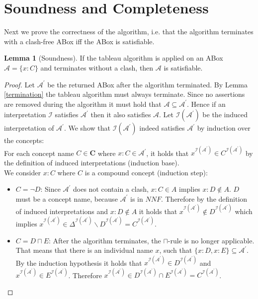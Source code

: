 \documentclass{book}
\theoremstyle{break}
\theoremstyle{definition}
\newtheorem{mylem}{Lemma}
\begin{document}
\section{Soundness and Completeness}
Next we prove the correctness of the algorithm, i.e. that the algorithm terminates with a clash-free ABox iff the ABox is satisfiable.
\begin{mylem}[Soundness]
If the tableau algorithm is applied on an ABox $\mathcal{A}=\{x:C\}$ and  terminates without a clash, then $\mathcal{A}$ is satisfiable.
\end{mylem}
\begin{proof}
Let $\mathcal{A}^\prime$ be the returned ABox after the algorithm terminated. By Lemma \ref{termination} the tableau algorithm must always terminate. Since no assertions are removed during the algorithm it must hold that $\mathcal{A}\subseteq\mathcal{A}^\prime$. Hence if an interpretation $\mathcal{I}$ satisfies $\mathcal{A}^\prime$ then it also satisfies $\mathcal{A}$. Let $\mathcal{I}(\mathcal{A}^\prime)$ be the induced interpretation of $\mathcal{A}^\prime$. We show that $\mathcal{I}(\mathcal{A}^\prime)$ indeed satisfies $\mathcal{A}^\prime$ by induction over the concepts:\\
For each concept name $C\in\mathbf{C}$ where $x:C\in\mathcal{A}^\prime$, it holds that $x^{\mathcal{I}(\mathcal{A}^\prime)}\in C^{\mathcal{I}(\mathcal{A}^\prime)}$ by the definition of induced interpretations (induction base).\\
We consider $x:C$ where $C$ is a compound concept (induction step):
\begin{itemize}
\item $C=\neg D$: Since $\mathcal{A}^\prime$ does not contain a clash, $x:C\in A$ implies $x:D\notin A$. $D$ must be a concept name, because $\mathcal{A}^\prime$ is in $NNF$. Therefore by the definition of induced interpretations and $x:D\notin A$ it holds that $x^{\mathcal{I}(\mathcal{A}^\prime)}\notin D^{\mathcal{I}(\mathcal{A}^\prime)}$ which implies $x^{\mathcal{I}(\mathcal{A}^\prime)}\in \Delta^{\mathcal{I}(\mathcal{A}^\prime)}\backslash D^{\mathcal{I}(\mathcal{A}^\prime)}=C^{\mathcal{I}(\mathcal{A}^\prime)}$.
\item $C=D\sqcap E$: After the algorithm terminates, the $\sqcap$-rule is no longer applicable. That means that there is an individual name $x$, such that $\{x:D, x:E\}\subseteq \mathcal{A}^\prime$. By the induction hypothesis it holds that $x^{\mathcal{I}(\mathcal{A}^\prime)}\in D^{\mathcal{I}(\mathcal{A}^\prime)}$ and $x^{\mathcal{I}(\mathcal{A}^\prime)}\in E^{\mathcal{I}(\mathcal{A}^\prime)}$. Therefore $x^{\mathcal{I}(\mathcal{A}^\prime)}\in D^{\mathcal{I}(\mathcal{A}^\prime)}\cap E^{\mathcal{I}(\mathcal{A}^\prime)}=C^{\mathcal{I}(\mathcal{A}^\prime)}$.

\end{itemize}
\end{proof}
\end{document}
